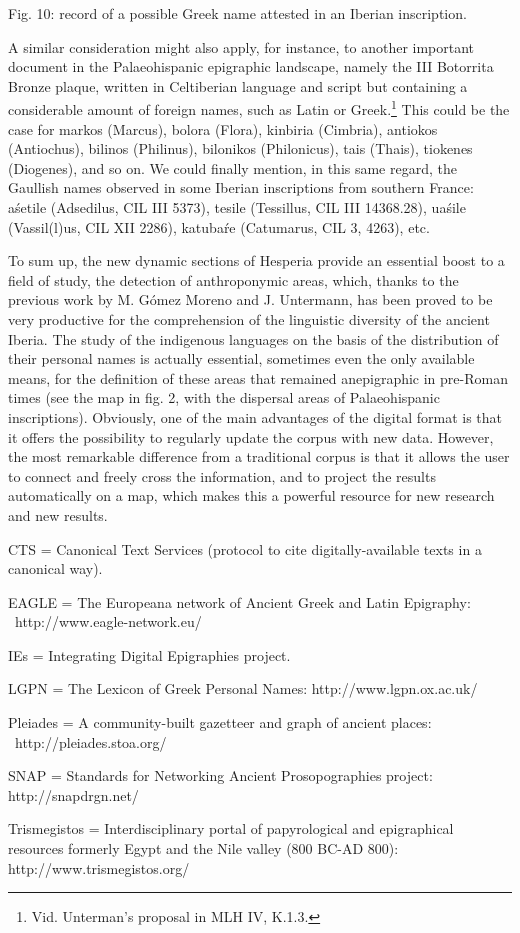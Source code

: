 \documentclass[amsthm,ebook]{saparticle}
\begin{document}
Fig. 10: record of a possible Greek name attested in an Iberian inscription.

A similar consideration might also apply, for instance, to another important document in the Palaeohispanic epigraphic
landscape, namely the III Botorrita Bronze plaque, written in Celtiberian language and script but containing a
considerable amount of foreign names, such as Latin or Greek.\footnote{ Vid. Unterman’s proposal in MLH IV, K.1.3. }
This could be the case for markos (Marcus), bolora (Flora), kinbiria (Cimbria), antiokos (Antiochus), bilinos
(Philinus), bilonikos (Philonicus), tais (Thais), tiokenes (Diogenes), and so on. We could finally mention, in this
same regard, the Gaullish names observed in some Iberian inscriptions from southern France: aśetile (Adsedilus, CIL III
5373), tesile (Tessillus, CIL III 14368.28), uaśile (Vassil(l)us, CIL XII 2286), katubaŕe (Catumarus, CIL 3, 4263),
etc.

To sum up, the new dynamic sections of Hesperia provide an essential boost to a field of study, the detection of
anthroponymic areas, which, thanks to the previous work by M. Gómez Moreno and J. Untermann, has been proved to be very
productive for the comprehension of the linguistic diversity of the ancient Iberia. The study of the indigenous
languages on the basis of the distribution of their personal names is actually essential, sometimes even the only
available means, for the definition of these areas that remained anepigraphic in pre-Roman times (see the map in fig.
2, with the dispersal areas of Palaeohispanic inscriptions). Obviously, one of the main advantages of the digital
format is that it offers the possibility to regularly update the corpus with new data. However, the most remarkable
difference from a traditional corpus is that it allows the user to connect and freely cross the information, and to
project the results automatically on a map, which makes this a powerful resource for new research and new results.


CTS = Canonical Text Services (protocol to cite digitally-available texts in a canonical way).

EAGLE = The Europeana network of Ancient Greek and Latin Epigraphy: \ http://www.eagle-network.eu/

IEs = Integrating Digital Epigraphies project.

LGPN = The Lexicon of Greek Personal Names: http://www.lgpn.ox.ac.uk/

Pleiades = A community-built gazetteer and graph of ancient places: \ http://pleiades.stoa.org/

SNAP = Standards for Networking Ancient Prosopographies project: http://snapdrgn.net/

Trismegistos = Interdisciplinary portal of papyrological and epigraphical resources formerly Egypt and the Nile valley
(800 BC-AD 800): http://www.trismegistos.org/



\end{document}
